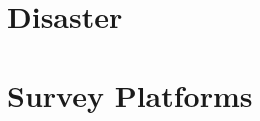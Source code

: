 % 


% 
\def\printbib{\printbibliography}%


\begin{refsection}
\chapter[21]{Disaster} %
\chapter[A]{Survey Platforms}
\red{\printbib}
\end{refsection}

